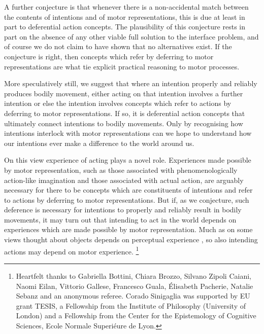 \documentclass[12pt,\papersize]{extarticle}
\begin{document}
A further conjecture is that whenever there is a non-accidental match between the contents of intentions and of motor representations, this is due at least in part to deferential action concepts. 
The plausibility of this conjecture rests in part on the absence of any other viable full solution to the interface problem, and of course we do not claim to have shown that no alternatives exist. 
If the conjecture is right, then concepts which refer by deferring to motor representations are what tie explicit practical reasoning to motor processes.

More speculatively still, we suggest that where an intention properly and reliably produces bodily movement, either acting on that intention involves a further intention or else the intention involves concepts which refer to actions by deferring to motor representations. If so, it is deferential action concepts that ultimately connect intentions to bodily movements. Only by recognising how intentions interlock with motor representations can we hope to understand how our intentions ever make a difference to the world around us.

On this view experience of acting plays a novel role. Experiences made possible by motor representation, such as those associated with phenomenologically action-like imagination and those associated with actual action, are arguably necessary for there to be concepts which are constituents of intentions and refer to actions by deferring to motor representations. But if, as we conjecture, such deference is necessary for intentions to properly and reliably result in bodily movements, it may turn out that intending to act in the world depends on experiences which are made possible by motor representation. Much as on some views thought about objects depends on perceptual experience \citep[e.g.][]{Campbell:2002ge}, so also intending actions may depend on motor experience.%
\footnote{
Heartfelt thanks to Gabriella Bottini, Chiara Brozzo, Silvano Zipoli Caiani, Naomi Eilan, Vittorio Gallese, Francesco Guala, \'Elisabeth Pacherie, Natalie Sebanz and an anonymous referee.  Corado Sinigaglia was supported by EU grant TESIS, a Fellowship from the Institute of Philosophy (University of London) and a Fellowship from the Center for the Epistemology of Cognitive Sciences, Ecole Normale Superiéure de Lyon.
}  







\end{document}
